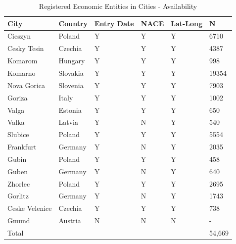 \documentclass[12pt]{article}    %
\begin{document}
\begin{table}[H] \hypertarget{Table 2.B.1}{}
\renewcommand\thetable{2.B.1}
\centering 
\footnotesize
\caption{Registered Economic Entities in Cities - Availability}
\begin{tabular}{|ll|lll|l|}
\hline
\textbf{City}  & \textbf{Country} & \textbf{Entry Date} & \textbf{NACE} & \textbf{Lat-Long}  & \textbf{N} \\
\hline
\hline
Cieszyn        & Poland           & Y                       & Y        & Y   & 6710     \\

Cesky Tesin    & Czechia          & Y                      & Y        & Y   &4387     \\
\hline
Komarom        & Hungary          & Y                      & Y        & Y      & 998  \\

Komarno        & Slovakia         & Y                       & Y        & Y   & 19354     \\
\hline
Nova Gorica    & Slovenia         & Y                     & Y        & Y    &  7903    \\

Goriza         & Italy            & Y            & Y            & Y          &  1002     \\
\hline
Valga          & Estonia          & Y            & Y           & Y            &650   \\

Valka          & Latvia           & Y            & N            & Y            & 540    \\
\hline
Slubice        & Poland           & Y            & Y           & Y             & 5554 \\

Frankfurt      & Germany          & Y            & N            & Y           & 2035    \\
\hline
Gubin          & Poland           & Y            & Y           & Y          & 458    \\

Guben          & Germany          & Y             & N            & Y           & 640     \\
\hline
Zhorlec        & Poland           & Y            & Y           & Y         &2695      \\

Gorlitz        & Germany          & Y             & N            & Y            & 1743     \\
\hline
Ceske Velenice & Czechia          & Y            & Y           & Y     & 738    \\

Gmund          & Austria          & N             & N            & N         & -    
 \\
\hline
\hline
Total          &           &                         &          &   & 54,669   \\
\hline
\end{tabular}
\end{table}
\end{document}

